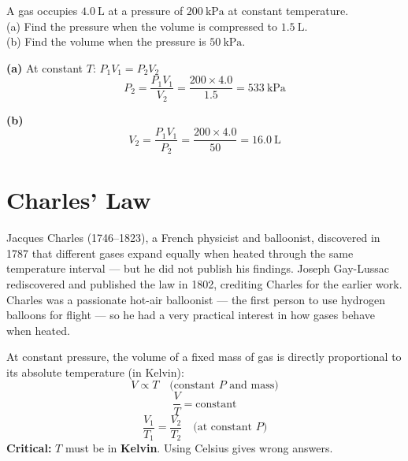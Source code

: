 \begin{examplebox}[14.1]
A gas occupies $4.0\ \text{L}$ at a pressure of
$200\ \text{kPa}$ at constant temperature.\\
(a) Find the pressure when the volume is compressed
to $1.5\ \text{L}$.\\
(b) Find the volume when the pressure is
$50\ \text{kPa}$.
\end{examplebox}

\begin{solutionbox}
\textbf{(a)} At constant $T$: $P_1V_1 = P_2V_2$
\[
  P_2 = \frac{P_1V_1}{V_2}
  = \frac{200 \times 4.0}{1.5}
  = 533\ \text{kPa}
\]

\textbf{(b)}
\[
  V_2 = \frac{P_1V_1}{P_2}
  = \frac{200 \times 4.0}{50}
  = 16.0\ \text{L}
\]
\end{solutionbox}

\section{Charles' Law}

\begin{historybox}
Jacques Charles (1746--1823), a French physicist and
balloonist, discovered in 1787 that different gases
expand equally when heated through the same temperature
interval --- but he did not publish his findings.
Joseph Gay-Lussac rediscovered and published the law
in 1802, crediting Charles for the earlier work.
Charles was a passionate hot-air balloonist --- the
first person to use hydrogen balloons for flight ---
so he had a very practical interest in how gases
behave when heated.
\end{historybox}

\begin{lawbox}
At constant pressure, the volume of a fixed mass of
gas is directly proportional to its absolute temperature
(in Kelvin):
\[
  V \propto T
  \quad \text{(constant } P \text{ and mass)}
\]
\[
  \frac{V}{T} = \text{constant}
\]
\[
  \boxed{\frac{V_1}{T_1} = \frac{V_2}{T_2}}
  \quad \text{(at constant } P\text{)}
\]
\textbf{Critical:} $T$ must be in \textbf{Kelvin}.
Using Celsius gives wrong answers.
\end{lawbox}

